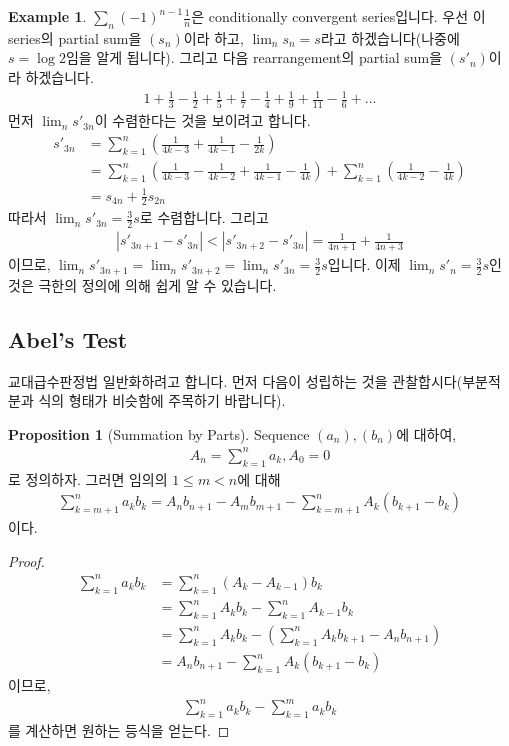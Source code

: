 \documentclass[12pt]{article}
\theoremstyle{definition}
\newtheorem{prop}[thm]{Proposition}
\newtheorem*{ex}{Example}
\newcommand{\abs}[1]{\left\vert#1\right\vert}
\begin{document}
	\begin{ex}
		\(\sum_n (-1)^{n-1}\frac{1}{n}\)은 conditionally convergent series입니다. 우선 이 series의 partial sum을 \((s_n)\)이라 하고, \(\lim_n s_n = s\)라고 하겠습니다(나중에 \(s = \log 2\)임을 알게 됩니다). 그리고 다음 rearrangement의 partial sum을 \((s'_n)\)이라 하겠습니다.
		\begin{align*}
			1 + \frac{1}{3} - \frac{1}{2} + \frac{1}{5} + \frac{1}{7} - \frac{1}{4} + \frac{1}{9} +\frac{1}{11} - \frac{1}{6} + ...
		\end{align*}
		먼저 \(\lim_n s'_{3n}\)이 수렴한다는 것을 보이려고 합니다.
		\begin{align*}
			s'_{3n} &= \sum_{k=1}^n (\frac{1}{4k-3} + \frac{1}{4k-1} - \frac{1}{2k})\\
			&= \sum_{k=1}^n (\frac{1}{4k-3} - \frac{1}{4k-2} + \frac{1}{4k-1} - \frac{1}{4k}) + \sum_{k=1}^{n} (\frac{1}{4k-2} - \frac{1}{4k})\\
			&= s_{4n} + \frac{1}{2} s_{2n}
		\end{align*}
		따라서 \(\lim_n s'_{3n} = \frac{3}{2}s\)로 수렴합니다. 그리고
		\begin{align*}
			\abs{s'_{3n+1} - s'_{3n}} < \abs{s'_{3n+2} - s'_{3n}} = \frac{1}{4n+1} + \frac{1}{4n+3}
		\end{align*}
		이므로, \(\lim_n s'_{3n+1} = \lim_n s'_{3n+2} = \lim_n s'_{3n} = \frac{3}{2} s\)입니다. 이제 \(\lim_n s'_n = \frac{3}{2}s\)인 것은 극한의 정의에 의해 쉽게 알 수 있습니다.
	\end{ex}

\subsection{Abel's Test}
교대급수판정법 일반화하려고 합니다. 먼저 다음이 성립하는 것을 관찰합시다(부분적분과 식의 형태가 비슷함에 주목하기 바랍니다).

\begin{prop}[Summation by Parts]
	Sequence \((a_n), (b_n)\)에 대하여,
	\begin{align*}
		A_n = \sum_{k=1}^{n} a_k, A_0 = 0
	\end{align*}
	로 정의하자. 그러면 임의의 \(1 \le m < n\)에 대해
	\begin{align*}
		\sum_{k=m+1}^{n} a_k b_k = A_n b_{n+1} - A_m b_{m+1} - \sum_{k=m+1}^n A_k (b_{k+1} - b_k)
	\end{align*}
	이다.
\end{prop}
\begin{proof}
	\begin{align*}
		\sum_{k=1}^n a_k b_k &= \sum_{k=1}^n (A_k - A_{k-1})b_k\\
		&= \sum_{k=1}^n A_k b_k - \sum_{k=1}^n A_{k-1} b_k\\
		&= \sum_{k=1}^n A_k b_k - (\sum_{k=1}^n A_{k} b_{k+1} - A_{n} b_{n+1})\\
		&= A_n b_{n+1} - \sum_{k=1}^n A_k (b_{k+1} - b_k)
	\end{align*}
	이므로,
	\begin{align*}
		\sum_{k=1}^n a_k b_k - \sum_{k=1}^m a_k b_k
	\end{align*}
	를 계산하면 원하는 등식을 얻는다.
\end{proof}
\end{document}
